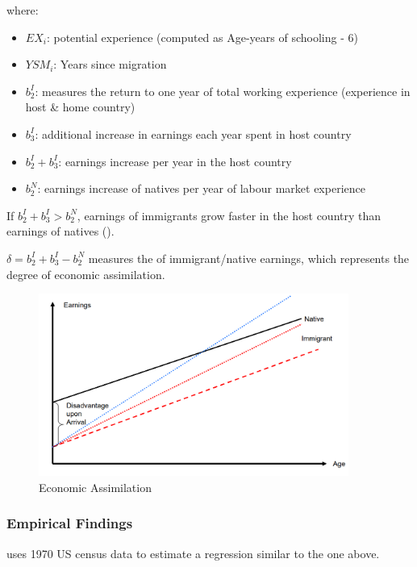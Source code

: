             where:
            
            \begin{itemize}
                \item $EX_i$: potential experience (computed as Age-years of schooling - 6)
                \item $YSM_i$: Years since migration
                \item $b_2^I$: measures the return to one year of total working experience (experience in host \& home country)
                \item $b_3^I$: additional increase in earnings each year spent in host country
                \item $b_2^I+b_3^I$: earnings increase per year in the host country
                \item $b_2^N$: earnings increase of natives per year of labour market experience
            \end{itemize}

            If $b_2^I+b_3^I > b_2^N$, earnings of immigrants grow faster in the host country than earnings of natives ().
            
            $\delta=b_2^I+b_3^I-b_2^N$ measures the  of immigrant/native earnings, which represents the degree of economic assimilation.

            \begin{figure}[H]
                \centering
                \includegraphics[width=4in]{images/ch11/13.png}
                \caption{Economic Assimilation}
            \end{figure}

        \subsubsection{Empirical Findings}

            \cite{chiswick_effect_1978} uses 1970 US census data to estimate a regression similar to the one above.
            
